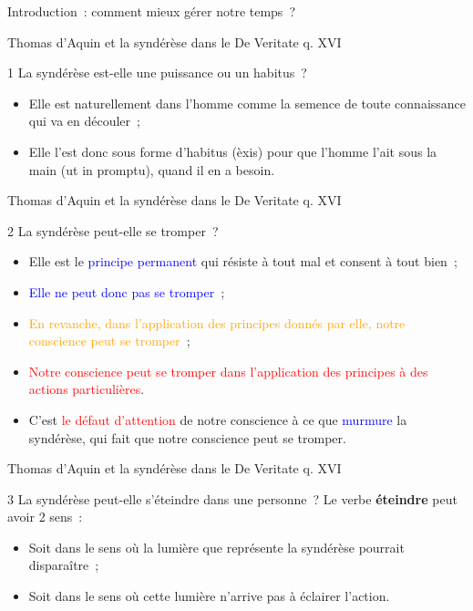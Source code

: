 \documentclass[11pt,xcolor=dvipsname,ignorenonframetext,handout]{beamer}
\begin{document}
\begin{frame}{Introduction~: comment mieux gérer notre temps~?}
\begin{frame}{Thomas d'Aquin et la syndérèse dans le De Veritate q. XVI}
\begin{block}{1 La syndérèse est-elle une puissance ou un habitus~?}
\begin{itemize}
            \item Elle est naturellement dans l'homme comme la semence de toute connaissance qui va en découler~;
            \item Elle l'est donc sous forme d'habitus (èxis) pour que l'homme l'ait sous la main (ut in promptu), quand il en a besoin.
        \end{itemize}
    \end{block}
\end{frame}
\begin{frame}{Thomas d'Aquin et la syndérèse dans le De Veritate q. XVI}
    \begin{block}{2 La syndérèse peut-elle se tromper~?}
        \begin{itemize}
            \rightskip=0pt\leftskip=0pt
            \item Elle est le \textcolor{blue}{principe permanent} qui résiste à tout mal et consent à tout bien~;
            \item \textcolor{blue}{Elle ne peut donc pas se tromper}~;
            \item \textcolor{orange}{En revanche, dans l'application des principes donnés par elle, notre conscience peut se tromper}~;
            \item \textcolor{red}{Notre conscience peut se tromper dans l'application des principes à des actions particulières}.
            \item C'est \textcolor{red}{le défaut d'attention} de notre conscience à ce que \textcolor{blue}{murmure} la syndérèse, qui fait que notre conscience peut se tromper.
        \end{itemize}
    \end{block}
\end{frame}
\begin{frame}{Thomas d'Aquin et la syndérèse dans le De Veritate q. XVI}
    \begin{block}{3 La syndérèse peut-elle s'éteindre dans une personne~?}
        \rightskip=0pt\leftskip=0pt
            Le verbe \textbf{éteindre} peut avoir 2 sens~:
        \begin{itemize}
            \rightskip=0pt\leftskip=0pt
            \item Soit dans le sens où la lumière que représente la syndérèse pourrait disparaître~;
            \item Soit dans le sens où cette lumière n'arrive pas à éclairer l'action.
        \end{itemize}
    \end{block}

\end{frame}
\end{frame}
\end{document}
